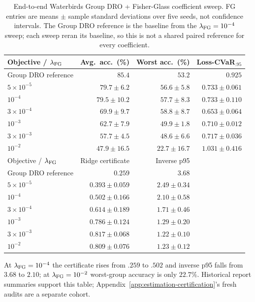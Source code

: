 \begin{table}[H]
\centering\small
\caption{End-to-end Waterbirds Group DRO + Fisher-Glass coefficient sweep. FG entries are means $\pm$ sample standard deviations over five seeds, not confidence intervals. The Group DRO reference is the baseline from the $\lambda_{\mathrm{FG}}=10^{-4}$ sweep; each sweep reran its baseline, so this is not a shared paired reference for every coefficient.}
\label{tab:e-frontier-performance}\label{tab:e-frontier-information}
\begin{tabular}{@{}lrrr@{}}
\toprule
Objective / $\lambda_{\mathrm{FG}}$ & Avg.\ acc.\ (\%) & Worst acc.\ (\%) & Loss-CVaR$_{.95}$\\
\midrule
Group DRO reference & $85.4$ & $53.2$ & $0.925$\\
$5\times10^{-5}$ & $79.7\pm6.2$ & $56.6\pm5.8$ & $0.733\pm0.061$\\
$10^{-4}$ & $79.5\pm10.2$ & $57.7\pm8.3$ & $0.733\pm0.110$\\
$3\times10^{-4}$ & $69.9\pm9.7$ & $58.8\pm8.7$ & $0.653\pm0.064$\\
$10^{-3}$ & $62.7\pm7.9$ & $49.9\pm1.8$ & $0.710\pm0.012$\\
$3\times10^{-3}$ & $57.7\pm4.5$ & $48.6\pm6.6$ & $0.717\pm0.036$\\
$10^{-2}$ & $47.9\pm16.5$ & $22.7\pm16.7$ & $1.031\pm0.416$\\
\midrule
Objective / $\lambda_{\mathrm{FG}}$ & Ridge certificate & Inverse p95 & \\
\midrule
Group DRO reference & $0.259$ & $3.68$ & \\
$5\times10^{-5}$ & $0.393\pm0.059$ & $2.49\pm0.34$ & \\
$10^{-4}$ & $0.502\pm0.166$ & $2.10\pm0.58$ & \\
$3\times10^{-4}$ & $0.614\pm0.189$ & $1.71\pm0.46$ & \\
$10^{-3}$ & $0.786\pm0.124$ & $1.29\pm0.20$ & \\
$3\times10^{-3}$ & $0.817\pm0.068$ & $1.22\pm0.10$ & \\
$10^{-2}$ & $0.809\pm0.076$ & $1.23\pm0.12$ & \\
\bottomrule
\end{tabular}
\end{table}

At $\lambda_{\mathrm{FG}}=10^{-4}$ the certificate rises from $.259$ to $.502$ and inverse p95 falls from $3.68$ to $2.10$; at $\lambda_{\mathrm{FG}}=10^{-2}$ worst-group accuracy is only $22.7\%$. Historical report summaries support this table; Appendix~\ref{app:estimation-certification}'s fresh audits are a separate cohort.

